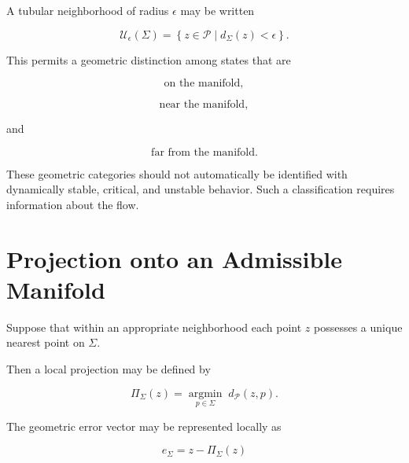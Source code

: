 \documentclass[12pt,oneside]{book}
\begin{document}
A tubular neighborhood of radius \(\epsilon\) may be written

\begin{equation}
    \mathcal{U}_{\epsilon}(\Sigma)
    =
    \left\{
        z\in\mathcal{P}
        \mid
        d_{\Sigma}(z)<\epsilon
    \right\}.
    \label{eq:tubular-neighborhood}
\end{equation}

This permits a geometric distinction among states that are

\begin{equation}
    \text{on the manifold},
\end{equation}

\begin{equation}
    \text{near the manifold},
\end{equation}

and

\begin{equation}
    \text{far from the manifold}.
\end{equation}

These geometric categories should not automatically be
identified with dynamically stable, critical, and unstable
behavior. Such a classification requires information about the
flow.


\section{Projection onto an Admissible Manifold}
\label{sec:projection-admissible-manifold}

Suppose that within an appropriate neighborhood each point
\(z\) possesses a unique nearest point on \(\Sigma\).

Then a local projection may be defined by

\begin{equation}
    \Pi_{\Sigma}(z)
    =
    \underset{p\in\Sigma}{\operatorname{argmin}}
    \;
    d_{\mathcal{P}}(z,p).
    \label{eq:nearest-point-projection}
\end{equation}

The geometric error vector may be represented locally as

\begin{equation}
    e_{\Sigma}
    =
    z
    -
    \Pi_{\Sigma}(z)
    \label{eq:local-geometric-error}
\end{equation}
\end{document}
